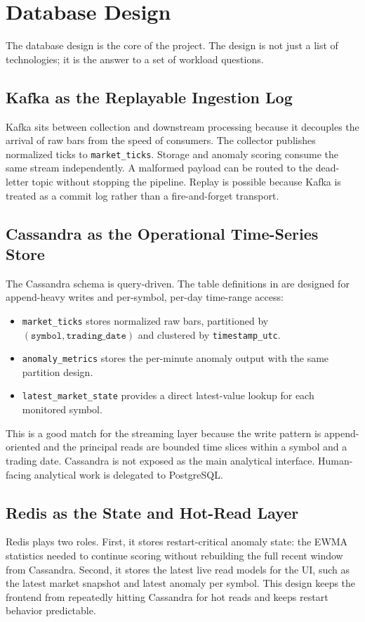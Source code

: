 \documentclass[11pt,a4paper]{article}
\begin{document}
\section{Database Design}
The database design is the core of the project. The design is not just a list of technologies; it is the answer to a set of workload questions.

\subsection{Kafka as the Replayable Ingestion Log}
Kafka sits between collection and downstream processing because it decouples the arrival of raw bars from the speed of consumers. The collector publishes normalized ticks to \texttt{market\_ticks}. Storage and anomaly scoring consume the same stream independently. A malformed payload can be routed to the dead-letter topic without stopping the pipeline. Replay is possible because Kafka is treated as a commit log rather than a fire-and-forget transport.

\subsection{Cassandra as the Operational Time-Series Store}
The Cassandra schema is query-driven. The table definitions in  are designed for append-heavy writes and per-symbol, per-day time-range access:
\begin{itemize}
    \item \texttt{market\_ticks} stores normalized raw bars, partitioned by \((\texttt{symbol}, \texttt{trading\_date})\) and clustered by \texttt{timestamp\_utc}.
    \item \texttt{anomaly\_metrics} stores the per-minute anomaly output with the same partition design.
    \item \texttt{latest\_market\_state} provides a direct latest-value lookup for each monitored symbol.
\end{itemize}

This is a good match for the streaming layer because the write pattern is append-oriented and the principal reads are bounded time slices within a symbol and a trading date. Cassandra is not exposed as the main analytical interface. Human-facing analytical work is delegated to PostgreSQL.

\subsection{Redis as the State and Hot-Read Layer}
Redis plays two roles. First, it stores restart-critical anomaly state: the EWMA statistics needed to continue scoring without rebuilding the full recent window from Cassandra. Second, it stores the latest live read models for the UI, such as the latest market snapshot and latest anomaly per symbol. This design keeps the frontend from repeatedly hitting Cassandra for hot reads and keeps restart behavior predictable.
\end{document}
